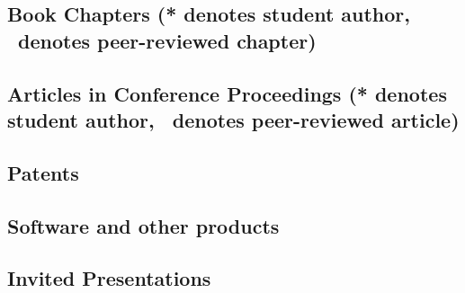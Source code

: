\documentclass[10pt]{article}
\begin{document}
    \subsection[Book Chapters]{Book Chapters (* denotes student author, \peerrevmark\ denotes peer-reviewed chapter)}
    \begin{refsection}
        \nocite{*}
        \printbibliography[heading=none,type=incollection]
    \end{refsection}
	\subsection[Articles in Conference Proceedings]{Articles in Conference Proceedings (* denotes student author, \peerrevmark\ denotes peer-reviewed article)}
    \begin{refsection}
        \nocite{*}
        \printbibliography[heading=none,type=inproceedings]
    \end{refsection}
  \subsection{Patents}
    \begin{refsection}
        \nocite{*}
        \printbibliography[heading=none,type=patent]
       \end{refsection}
  \subsection{Software and other products}
	
	\subsection{Invited Presentations}
    \begin{enumerate}
    
    
    \end{enumerate}
	\iffalse
	\subsection{Published Abstracts}
    \begin{enumerate}
    
    
    \end{enumerate}
    \fi
\end{document}
